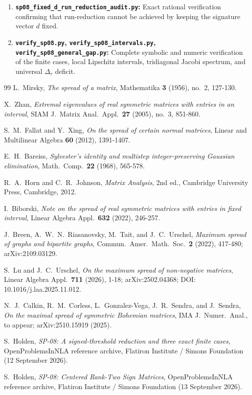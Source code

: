 \documentclass[11pt,reqno]{article}
\theoremstyle{definition}
\begin{document}
\begin{enumerate}
    \item \textbf{\texttt{sp08\_fixed\_d\_run\_reduction\_audit.py}:} Exact rational verification confirming that run-reduction cannot be achieved by keeping the signature vector $d$ fixed.
    \item \textbf{\texttt{verify\_sp08.py}, \texttt{verify\_sp08\_intervals.py}, \texttt{verify\_sp08\_general\_gap.py}:} Complete symbolic and numeric verification of the finite cases, local Lipschitz intervals, tridiagonal Jacobi spectrum, and universal $\Delta_r$ deficit.
\end{enumerate}

\begin{thebibliography}{99}
L.~Mirsky, \emph{The spread of a matrix}, Mathematika \textbf{3} (1956), no.~2, 127-130.

X.~Zhan, \emph{Extremal eigenvalues of real symmetric matrices with entries in an interval}, SIAM J.\ Matrix Anal.\ Appl.\ \textbf{27} (2005), no.~3, 851-860.

S.~M.~Fallat and Y.~Xing, \emph{On the spread of certain normal matrices}, Linear and Multilinear Algebra \textbf{60} (2012), 1391-1407.

E.~H.~Bareiss, \emph{Sylvester's identity and multistep integer-preserving Gaussian elimination}, Math.\ Comp.\ \textbf{22} (1968), 565-578.

R.~A.~Horn and C.~R.~Johnson, \emph{Matrix Analysis}, 2nd ed., Cambridge University Press, Cambridge, 2012.

I.~Biborski, \emph{Note on the spread of real symmetric matrices with entries in fixed interval}, Linear Algebra Appl.\ \textbf{632} (2022), 246-257.

J.~Breen, A.~W.~N.~Riasanovsky, M.~Tait, and J.~C.~Urschel, \emph{Maximum spread of graphs and bipartite graphs}, Commun.\ Amer.\ Math.\ Soc.\ \textbf{2} (2022), 417-480; arXiv:2109.03129.

S.~Lu and J.~C.~Urschel, \emph{On the maximum spread of non-negative matrices}, Linear Algebra Appl.\ \textbf{711} (2026), 1-18; arXiv:2502.04368; DOI: 10.1016/j.laa.2025.11.012.

N.~J.~Calkin, R.~M.~Corless, L.~Gonzalez-Vega, J.~R.~Sendra, and J.~Sendra, \emph{On the maximal spread of symmetric Bohemian matrices}, IMA J.\ Numer.\ Anal., to appear; arXiv:2510.15919 (2025).

S.~Holden, \emph{SP-08: A signed-threshold reduction and three exact finite cases}, OpenProblemsInNLA reference archive, Flatiron Institute / Simons Foundation (12 September 2026).

S.~Holden, \emph{SP-08: Centered Rank-Two Sign Matrices}, OpenProblemsInNLA reference archive, Flatiron Institute / Simons Foundation (13 September 2026).
\end{thebibliography}
\end{document}
